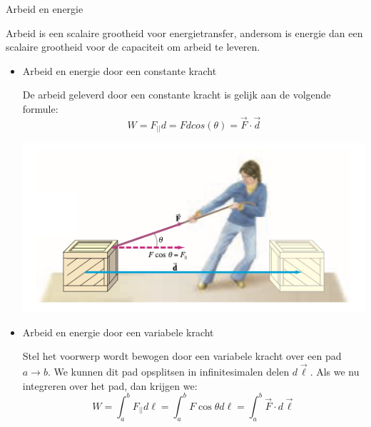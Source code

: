 \begin{theo}{Arbeid en energie}

    Arbeid is een scalaire grootheid voor energietransfer, andersom is energie dan een scalaire grootheid voor de capaciteit om arbeid te leveren.

    \begin{itemize}
    
        \item{Arbeid en energie door een constante kracht}
        
            De arbeid geleverd door een constante kracht is gelijk aan de volgende formule:
            \begin{equation*}
                W = F_{||}d = Fdcos(\theta) = \Vec{F} \cdot \Vec{d}
            \end{equation*}
            \begin{center}
                \includegraphics[scale = 0.15]{Images/Dynamica/Arbeid bij constante kracht.png}
            \end{center}
        \item{Arbeid en energie door een variabele kracht}
        
            Stel het voorwerp wordt bewogen door een variabele kracht over een pad $ a \to b $. We kunnen dit pad opsplitsen in infinitesimalen delen $ d\Vec{\ell} $. Als we nu integreren over het pad, dan krijgen we: 
            \begin{equation*}
                W = \int_{a}^{b}  F_{||}d\ell = \int_{a}^{b} F \cos\theta d\ell = \int_{a}^{b} \Vec{F} \cdot d\Vec{\ell}
            \end{equation*}
    \end{itemize}
\end{theo}


